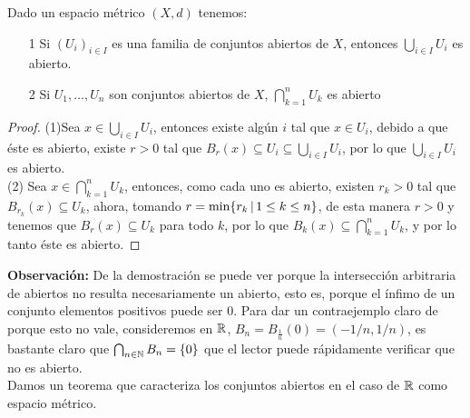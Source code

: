 \documentclass[12pt,a4paper]{book}
\begin{document}
\begin{prop}
Dado un espacio métrico $(X,d)$ tenemos:
\begin{itemize}
\item[1] Si $(U_i)_{i \in I}$ es una familia de conjuntos abiertos de $X$, entonces $\bigcup_{i \in I} U_i$ es abierto.
\item[2] Si $U_1, \ldots, U_n$ son conjuntos abiertos de $X$, $\bigcap_{k = 1}^n U_k$ es abierto
\end{itemize}
\begin{proof}
(1)Sea $x \in \bigcup_{i \in I} U_i$, entonces existe algún $i$ tal que $x \in U_i$, debido a que éste es abierto, existe $r >0$ tal que $B_r(x) \subseteq U_i \subseteq \bigcup_{i \in I} U_i$, por lo que $\bigcup_{i \in I} U_i$ es abierto.\\
(2) Sea $x\in \bigcap_{k = 1}^n U_k$, entonces, como cada uno es abierto, existen $r_k >0$ tal que $B_{r_k}(x) \subseteq U_k$, ahora, tomando $r = \min \{r_k \,\vert\, 1 \leq k \leq n\}$, de esta manera $r>0$ y tenemos que $B_r(x)\subseteq U_k$ para todo $k$, por lo que $B_k(x) \subseteq \bigcap_{k = 1}^n U_k$, y por lo tanto éste es abierto.
\end{proof}
\end{prop}
\textbf{Observación:} De la demostración se puede ver porque la intersección arbitraria de abiertos no resulta necesariamente un abierto, esto es, porque el ínfimo de un conjunto elementos positivos puede ser 0. Para dar un contraejemplo claro de porque esto no vale, consideremos en $\mathbb{R}$, $B_n = B_{\frac{1}{n}}(0) = (-1/n,1/n)$, es bastante claro que $\bigcap_{{{n} \in \mathbb{N}}} B_n = \{0\}$ que el lector puede rápidamente verificar que no es abierto.\\[0.5cm]
Damos un teorema que caracteriza los conjuntos abiertos en el caso de $\mathbb{R}$ como espacio métrico.
\end{document}
